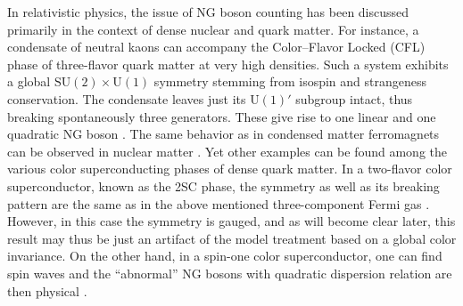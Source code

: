 \documentclass[final,2p,times,12pt,sort&compress]{elsarticle}
\newcommand\gr[1]{\mathrm{#1}}              %
\begin{document}
In relativistic physics, the issue of NG boson counting has been discussed
primarily in the context of dense nuclear and quark matter. For instance, a
condensate of neutral kaons can accompany the Color--Flavor Locked (CFL) phase
of three-flavor quark matter at very high densities. Such a system exhibits a
global $\gr{SU(2)\times U(1)}$ symmetry stemming from isospin and strangeness
conservation. The condensate leaves just its $\gr{U(1)}'$ subgroup intact,
thus breaking spontaneously three generators. These give rise to one linear and
one quadratic NG boson
\cite{Schafer:2001bq,Miransky:2001tw,Andersen:2006ys}. The same behavior
as in condensed matter ferromagnets can be observed in nuclear matter
\cite{Beraudo:2004zr}. Yet other examples can be found among the various color
superconducting phases of dense quark matter. In a two-flavor color
superconductor, known as the 2SC phase, the symmetry as well as its breaking
pattern are the same as in the above mentioned three-component Fermi gas
\cite{Blaschke:2004cs}. However, in this case the symmetry is gauged, and
as will become clear later, this result may thus be just an artifact of the
model treatment based on a global color invariance. On the other hand, in a
spin-one color superconductor, one can find spin waves and the ``abnormal'' NG
bosons with quadratic dispersion relation are then physical
\cite{Buballa:2002wy}.
\end{document}
